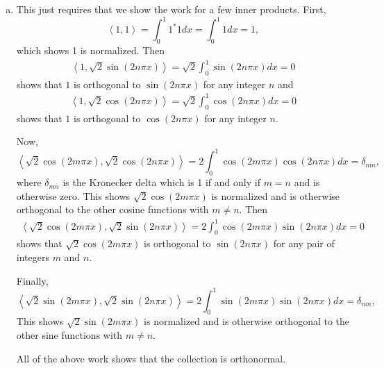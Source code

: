 \documentclass[12pt]{article} %
\newcommand{\innprod}[2]{\left\langle #1, #2\right\rangle}
\begin{document}
\begin{solution}
\begin{enumerate}[(a)]
\item This just requires that we show the work for a few inner products. First,
\[
\innprod{1}{1} = \int_0^1 1^* 1 dx = \int_0^1 1 dx = 1,
\]
which shows 1 is normalized. Then
\begin{align*}
\innprod{1}{\sqrt{2} \sin(2n\pi x)} = \sqrt{2} \int_0^1 \sin(2n\pi x) dx = 0
\end{align*}
shows that $1$ is orthogonal to $\sin(2n \pi x)$ for any integer $n$ and
\begin{align*}
\innprod{1}{\sqrt{2} \cos(2n\pi x)} = \sqrt{2} \int_0^1 \cos(2n\pi x) dx = 0
\end{align*}
shows that $1$ is orthogonal to $\cos(2n \pi x)$ for any integer $n$.

Now, 
\[
\innprod{\sqrt{2}\cos(2m\pi x)}{\sqrt{2}\cos(2n\pi x)} = 2 \int_0^1 \cos(2m\pi x) \cos(2n\pi x) dx = \delta_{mn},
\]
where $\delta_{mn}$ is the Kronecker delta which is 1 if and only if $m=n$ and is otherwise zero. This shows $\sqrt{2}\cos(2m\pi x)$ is normalized and is otherwise orthogonal to the other cosine functions with $m\neq n$. Then
\begin{align*}
\innprod{\sqrt{2}\cos(2m\pi x)}{\sqrt{2} \sin(2n\pi x)} = 2 \int_0^1 \cos(2m\pi x)\sin(2n\pi x) dx = 0
\end{align*}
shows that $\sqrt{2}\cos(2m\pi x)$ is orthogonal to $\sin(2n \pi x)$ for any pair of integers $m$ and $n$. 

Finally, 
\[
\innprod{\sqrt{2}\sin(2m\pi x)}{\sqrt{2}\sin(2n\pi x)} = 2 \int_0^1 \sin(2m\pi x) \sin(2n\pi x) dx = \delta_{mn},
\]
This shows $\sqrt{2}\sin(2m\pi x)$ is normalized and is otherwise orthogonal to the other sine functions with $m\neq n$. 

All of the above work shows that the collection is orthonormal.


\end{enumerate}
\end{solution}
\end{document}
